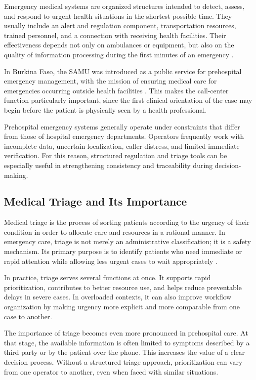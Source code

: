 \documentclass[a4paper,12pt,oneside]{report}
\begin{document}
Emergency medical systems are organized structures intended to detect, assess, and respond to urgent health situations in the shortest possible time. They usually include an alert and regulation component, transportation resources, trained personnel, and a connection with receiving health facilities. Their effectiveness depends not only on ambulances or equipment, but also on the quality of information processing during the first minutes of an emergency \cite{turner2019,miller2022}.

In Burkina Faso, the SAMU was introduced as a public service for prehospital emergency management, with the mission of ensuring medical care for emergencies occurring outside health facilities \cite{ministry2024_urgences}. This makes the call-center function particularly important, since the first clinical orientation of the case may begin before the patient is physically seen by a health professional.

Prehospital emergency systems generally operate under constraints that differ from those of hospital emergency departments. Operators frequently work with incomplete data, uncertain localization, caller distress, and limited immediate verification. For this reason, structured regulation and triage tools can be especially useful in strengthening consistency and traceability during decision-making.

\subsection{Medical Triage and Its Importance}

Medical triage is the process of sorting patients according to the urgency of their condition in order to allocate care and resources in a rational manner. In emergency care, triage is not merely an administrative classification; it is a safety mechanism. Its primary purpose is to identify patients who need immediate or rapid attention while allowing less urgent cases to wait appropriately \cite{christ2016,ahrqtriage}.

In practice, triage serves several functions at once. It supports rapid prioritization, contributes to better resource use, and helps reduce preventable delays in severe cases. In overloaded contexts, it can also improve workflow organization by making urgency more explicit and more comparable from one case to another.

The importance of triage becomes even more pronounced in prehospital care. At that stage, the available information is often limited to symptoms described by a third party or by the patient over the phone. This increases the value of a clear decision process. Without a structured triage approach, prioritization can vary from one operator to another, even when faced with similar situations.
\end{document}
